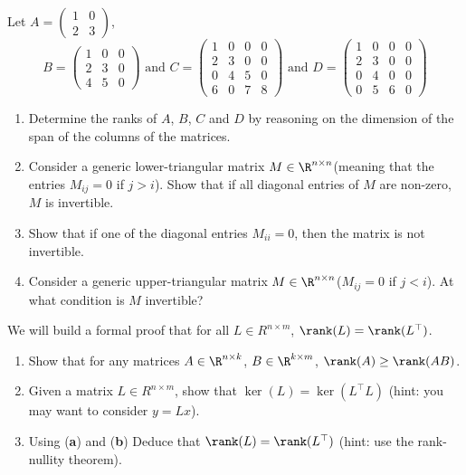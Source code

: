 \documentclass[11pt,nocut]{article}
\begin{document}
\begin{problem}[2 points]
    Let $ A = \begin{pmatrix}
        1 & 0\\
        2 & 3
    \end{pmatrix}
    $,  
    $$
    B = \begin{pmatrix}
        1 & 0 & 0 \\
        2 & 3 & 0 \\
        4 & 5 & 0
    \end{pmatrix}
    \text{ and }
    C = \begin{pmatrix}
        1 & 0 & 0 & 0 \\
        2 & 3 & 0 & 0 \\
        0 & 4 & 5 & 0 \\
        6 & 0 & 7 & 8
    \end{pmatrix}
    \text{ and }
    D = \begin{pmatrix}
        1 & 0 & 0 & 0 \\
        2 & 3 & 0 & 0 \\
        0 & 4 & 0 & 0 \\
        0 & 5 & 6 & 0
    \end{pmatrix}
    $$ 
    \begin{enumerate}[label=\normalfont(\textbf{\alph*})]
        \item Determine the ranks of $A$, $B$, $C$ and $D$ by reasoning on the dimension of the span of the columns of the matrices.
        \item Consider a generic lower-triangular matrix $M \in \R^{n\times n}$(meaning that the entries $M_{ij} = 0$ if $j>i$). Show that if all diagonal entries of $M$ are non-zero, $M$ is invertible. 
        \item Show that if one of the diagonal entries $M_{ii} = 0$, then the matrix is not invertible.
        \item Consider a generic upper-triangular matrix $M \in \R^{n\times n}$($M_{ij} = 0$ if $j<i$). At what condition is $M$ invertible?
    \end{enumerate}
\end{problem}

\begin{problem}[2 points]
    We will build a formal proof that for all $L\in R^{n \times m}$, $\rank(L) = \rank(L^\top)$.
    \begin{enumerate}[label=\normalfont(\textbf{\alph*})]
        \item Show that for any matrices $A\in \R^{n \times k}$, $B \in \R^{k \times m}$, $\rank(A) \geq \rank(AB)$.
        \item Given a matrix $L\in R^{n \times m}$, show that $\ker(L) = \ker(L^\top L)$ (hint: you may want to consider $y = Lx$).
        \item Using ({\bf a}) and ({\bf b}) Deduce that $\rank(L) = \rank(L^\top)$ (hint: use the rank-nullity theorem).
    \end{enumerate}

\end{problem}
\end{document}
